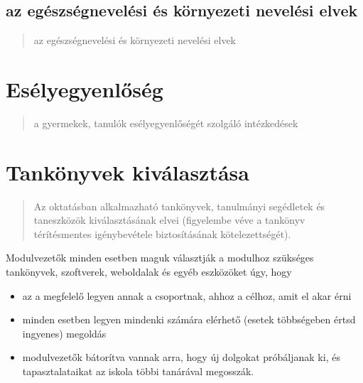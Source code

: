\subsection{az egészségnevelési és környezeti nevelési elvek}

\begin{quote}
      az egészségnevelési és környezeti nevelési elvek
\end{quote}
\section{Esélyegyenlőség}\label{esuxe9lyegyenlux151suxe9g}

\begin{quote}
      a gyermekek, tanulók esélyegyenlőségét szolgáló intézkedések
\end{quote}






\section{Tankönyvek kiválasztása}

\begin{quote}
      Az oktatásban alkalmazható tankönyvek, tanulmányi segédletek és
      taneszközök kiválasztásának elvei (figyelembe véve a tankönyv
      térítésmentes igénybevétele biztosításának kötelezettségét).
\end{quote}

Modulvezetők minden esetben maguk választják a modulhoz szükséges
tankönyvek, szoftverek, weboldalak és egyéb eszközöket úgy, hogy

\begin{itemize}

      \item
            az a megfelelő legyen annak a csoportnak, ahhoz a célhoz, amit el
            akar
            érni
      \item
            minden esetben legyen mindenki számára elérhető (esetek többségeben
            értsd ingyenes) megoldás
      \item
            modulvezetők bátorítva vannak arra, hogy új dolgokat próbáljanak
            ki,
            és tapasztalataikat az iskola többi tanárával megosszák.
\end{itemize}

